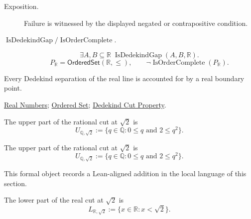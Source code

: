 \begin{remark*}
\begin{description}
  \item[Exposition.]
  Failure is witnessed by the displayed negated or contrapositive condition.

  \item[\(\operatorname{IsDedekindGap} / \operatorname{IsOrderComplete}.\)]
  \[
\exists A,B\subseteq\mathbb{R}\;\operatorname{IsDedekindGap}(A,B,\mathbb{R}).
\]
\[
P_{\mathbb{R}}=\mathsf{OrderedSet}(\mathbb{R},\leq),\qquad
\neg\operatorname{IsOrderComplete}(P_{\mathbb{R}}).
\]
\end{description}
\end{remark*}
\begin{remark*}[Interpretation]
Every Dedekind separation of the real line is accounted for by a real boundary
point.
\end{remark*}
\begin{dependencies}
\hyperref[def:reals]{Real Numbers};
\hyperref[def:ordered-set]{Ordered Set};
\hyperref[thm:dedekind-cut-property]{Dedekind Cut Property}.
\end{dependencies}

\begin{definition}
\label{def:rational-cut-upper-at-sqrt-two}
The upper part of the rational cut at $\sqrt2$ is
\[
  U_{\mathbb Q,\sqrt2}:=\{q\in\mathbb Q:0\le q\text{ and }2\le q^2\}.
\]
\end{definition}

\begin{remark*}
The upper part of the rational cut at $\sqrt2$ is
\[
  U_{\mathbb Q,\sqrt2}:=\{q\in\mathbb Q:0\le q\text{ and }2\le q^2\}.
\]
\end{remark*}

\begin{remark*}[Interpretation]
This formal object records a Lean-aligned addition in the local language of this section.
\end{remark*}

\begin{dependencies}
\NoLocalDependencies
\end{dependencies}
\begin{definition}
\label{def:real-cut-lower-at-sqrt-two}
The lower part of the real cut at $\sqrt2$ is
\[
  L_{\mathbb R,\sqrt2}:=\{x\in\mathbb R:x<\sqrt2\}.
\]
\end{definition}

